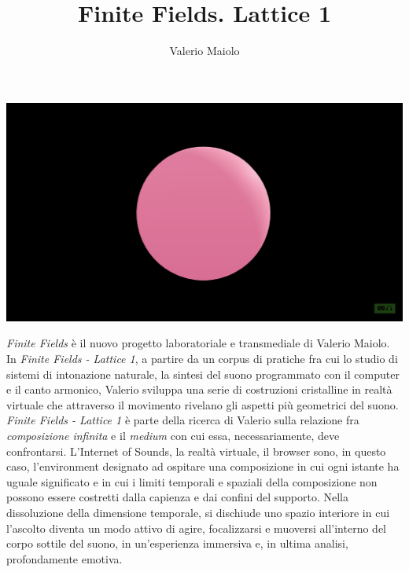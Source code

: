 \documentclass[10pt, oneside]{memoir}   	%
\title{Finite Fields. Lattice 1}
\author{Valerio Maiolo}
\date{}
\begin{document}

\maketitle

\begin{center}
\includegraphics[scale=0.3]{sferaVR.png}
\end{center}

\newpage

\textit{Finite Fields} è il nuovo progetto laboratoriale e transmediale di Valerio Maiolo. In \textit{Finite Fields - Lattice 1}, a partire da un corpus di pratiche fra cui lo studio di sistemi di intonazione naturale, la sintesi del suono programmato con il computer e il canto armonico, Valerio sviluppa una serie di costruzioni cristalline in realtà virtuale che attraverso il movimento rivelano gli aspetti più geometrici del suono. \textit{Finite Fields - Lattice 1} è parte della ricerca di Valerio sulla relazione fra \textit{composizione infinita} e il \textit{medium} con cui essa, necessariamente, deve confrontarsi. L'Internet of Sounds, la realtà virtuale, il browser sono, in questo caso, l'environment designato ad ospitare una composizione in cui ogni istante ha uguale significato e in cui i limiti temporali e spaziali della composizione non possono essere costretti dalla capienza e dai confini del supporto. Nella dissoluzione della dimensione temporale, si dischiude uno spazio interiore in cui l'ascolto diventa un modo attivo di agire, focalizzarsi e muoversi all'interno del corpo sottile del suono, in un'esperienza immersiva e, in ultima analisi, profondamente emotiva. 
\end{document}
